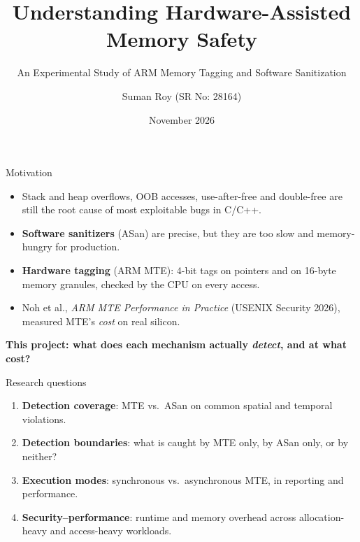 \documentclass[aspectratio=169,11pt]{beamer}
\title{Understanding Hardware-Assisted Memory Safety}
\subtitle{An Experimental Study of ARM Memory Tagging and Software Sanitization}
\author{Suman Roy \quad (SR No: 28164)}
\institute{E0-256 Computer Systems Security \\ Indian Institute of Science, Bengaluru}
\date{November 2026}
\newcommand{\take}[1]{\par\vspace{4pt}{\color{accent}\rule{2pt}{1.0em}}\hspace{6pt}\textbf{#1}}
\begin{document}
\begin{frame}
\titlepage
\end{frame}

\begin{frame}{Motivation}
\begin{itemize}\itemsep6pt
\item Stack and heap overflows, OOB accesses, use-after-free and double-free are still the root cause of most exploitable bugs in C/C++.
\item \textbf{Software sanitizers} (ASan) are precise, but they are too slow and memory-hungry for production.
\item \textbf{Hardware tagging} (ARM MTE): 4-bit tags on pointers and on 16-byte memory granules, checked by the CPU on every access.
\item Noh et al., \emph{ARM MTE Performance in Practice} (USENIX Security 2026), measured MTE's \emph{cost} on real silicon.
\end{itemize}
\take{This project: what does each mechanism actually \emph{detect}, and at what cost?}
\end{frame}

\begin{frame}{Research questions}
\begin{enumerate}\itemsep8pt
\item[\textbf{RQ1}] \textbf{Detection coverage}: MTE vs.\ ASan on common spatial and temporal violations.
\item[\textbf{RQ2}] \textbf{Detection boundaries}: what is caught by MTE only, by ASan only, or by neither?
\item[\textbf{RQ3}] \textbf{Execution modes}: synchronous vs.\ asynchronous MTE, in reporting and performance.
\item[\textbf{RQ4}] \textbf{Security--performance}: runtime and memory overhead across allocation-heavy and access-heavy workloads.
\end{enumerate}
\end{frame}
\end{document}

